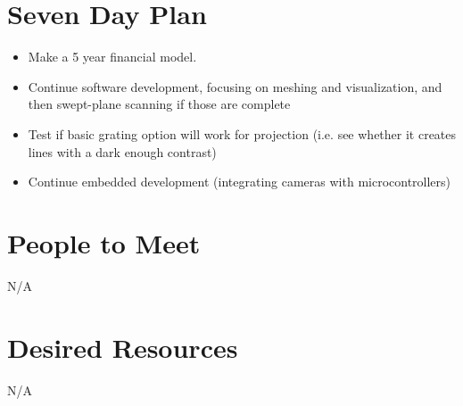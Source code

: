 \documentclass[10pt]{article}
\begin{document}
\section{Seven Day Plan}
\begin{itemize}
  \item Make a 5 year financial model.
  \item Continue software development, focusing on meshing and visualization, and
    then swept-plane scanning if those are complete
  \item Test if basic grating option will work for projection (i.e. see whether
    it creates lines with a dark enough contrast)
  \item Continue embedded development (integrating cameras with microcontrollers)
\end{itemize}

\section{People to Meet}
N/A

\section{Desired Resources}
N/A
\end{document}
